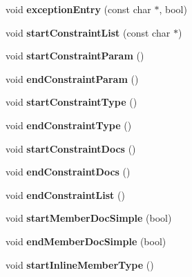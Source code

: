 \begin{DoxyCompactItemize}
void {\bfseries exception\+Entry} (const char $\ast$, bool)
\item 
\mbox{\label{class_latex_generator_a675d59502d27b460e2387404a98a6dcd}} 
void {\bfseries start\+Constraint\+List} (const char $\ast$)
\item 
\mbox{\label{class_latex_generator_ae6ec7c8f63ab59e21b67d94098598226}} 
void {\bfseries start\+Constraint\+Param} ()
\item 
\mbox{\label{class_latex_generator_aa5de32252d0077923cc12a3b85680f0a}} 
void {\bfseries end\+Constraint\+Param} ()
\item 
\mbox{\label{class_latex_generator_a25d8896cd81e657b37775af2a331761d}} 
void {\bfseries start\+Constraint\+Type} ()
\item 
\mbox{\label{class_latex_generator_a752b5bd6ac615dee39c6c9c9e296f1dd}} 
void {\bfseries end\+Constraint\+Type} ()
\item 
\mbox{\label{class_latex_generator_a88eb70bdc53db662b4b4292ca3fafbb3}} 
void {\bfseries start\+Constraint\+Docs} ()
\item 
\mbox{\label{class_latex_generator_a46875df306394c532e545e2d7f599e6c}} 
void {\bfseries end\+Constraint\+Docs} ()
\item 
\mbox{\label{class_latex_generator_a2efc2387efe483773b46ac00f82d13cc}} 
void {\bfseries end\+Constraint\+List} ()
\item 
\mbox{\label{class_latex_generator_aaba5f2f9ee52cedcf3282f41a9a234f2}} 
void {\bfseries start\+Member\+Doc\+Simple} (bool)
\item 
\mbox{\label{class_latex_generator_a67e64b5315c8f547c6da03ed4c11955e}} 
void {\bfseries end\+Member\+Doc\+Simple} (bool)
\item 
\mbox{\label{class_latex_generator_a44918d04425a332e92e30465f7e05a64}} 
void {\bfseries start\+Inline\+Member\+Type} ()

\end{DoxyCompactItemize}
